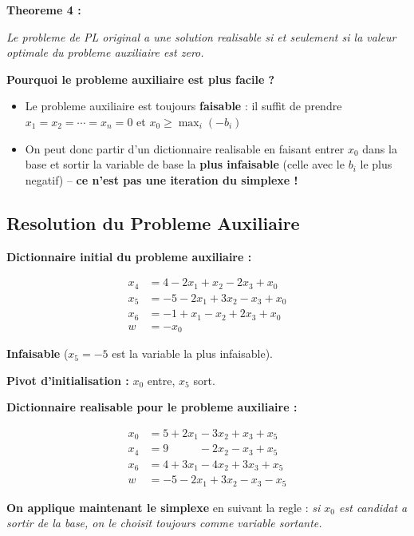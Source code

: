 \documentclass[12pt,a4paper]{article}
\begin{document}
\begin{theoreme}
\textbf{Theoreme 4 :}

\textit{Le probleme de PL original a une solution realisable si et seulement si la valeur optimale du probleme auxiliaire est zero.}
\end{theoreme}

\begin{astuce}
\textbf{Pourquoi le probleme auxiliaire est plus facile ?}

\begin{itemize}
    \item Le probleme auxiliaire est toujours \textcolor{defvert}{\textbf{faisable}} : il suffit de prendre $x_1 = x_2 = \cdots = x_n = 0$ et $x_0 \geq \max_i(-b_i)$
    \item On peut donc partir d'un dictionnaire realisable en faisant entrer $x_0$ dans la base et sortir la variable de base la \textcolor{importantrouge}{\textbf{plus infaisable}} (celle avec le $b_i$ le plus negatif) -- \textbf{ce n'est pas une iteration du simplexe !}
\end{itemize}
\end{astuce}

\newpage
\subsection{Resolution du Probleme Auxiliaire}

\begin{exemple}
\textbf{Dictionnaire initial du probleme auxiliaire :}

\begin{align*}
x_4 &= 4 - 2x_1 + x_2 - 2x_3 + x_0\\
x_5 &= -5 - 2x_1 + 3x_2 - x_3 + x_0\\
x_6 &= -1 + x_1 - x_2 + 2x_3 + x_0\\
w &= -x_0
\end{align*}

\textcolor{importantrouge}{\textbf{Infaisable}} ($x_5 = -5$ est la variable la plus infaisable).

\textbf{Pivot d'initialisation :} $x_0$ entre, $x_5$ sort.

\textbf{Dictionnaire realisable pour le probleme auxiliaire :}

\begin{align*}
x_0 &= 5 + 2x_1 - 3x_2 + x_3 + x_5\\
x_4 &= 9 \phantom{{}+2x_1} - 2x_2 - x_3 + x_5\\
x_6 &= 4 + 3x_1 - 4x_2 + 3x_3 + x_5\\
w &= -5 - 2x_1 + 3x_2 - x_3 - x_5
\end{align*}

\textbf{On applique maintenant le simplexe} en suivant la regle : \textit{si $x_0$ est candidat a sortir de la base, on le choisit toujours comme variable sortante.}
\end{exemple}
\end{document}
